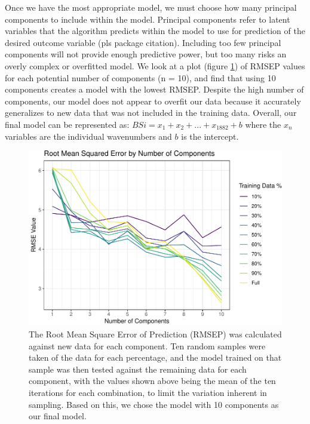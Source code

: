 \documentclass[water,article,submit,moreauthors,pdftex]{mdpi}
\begin{document}
Once we have the most appropriate model, we must choose how many
principal components to include within the model. Principal components
refer to latent variables that the algorithm predicts within the model
to use for prediction of the desired outcome variable (pls package
citation). Including too few principal components will not provide
enough predictive power, but too many risks an overly complex or
overfitted model. We look at a plot (figure \ref{fig:fig4}) of RMSEP
values for each potential number of components (n = 10), and find that
using 10 components creates a model with the lowest RMSEP. Despite the
high number of components, our model does not appear to overfit our data
because it accurately generalizes to new data that was not included in
the training data. Overall, our final model can be represented as:
\(BSi = x_1 + x_2 + . . . + x_{1882} + b\) where the \(x_n\) variables
are the individual wavenumbers and \(b\) is the intercept.

\begin{figure}

{\centering \includegraphics{final_paper_draft_files/figure-latex/fig4-1} 

}

\caption{The Root Mean Square Error of Prediction (RMSEP) was calculated against new data for each component. Ten random samples were taken of the data for each percentage, and the model trained on that sample was then tested against the remaining data for each component, with the values shown above being the mean of the ten iterations for each combination, to limit the variation inherent in sampling. Based on this, we chose the model with 10 components as our final model.}\label{fig:fig4}
\end{figure}
\end{document}
